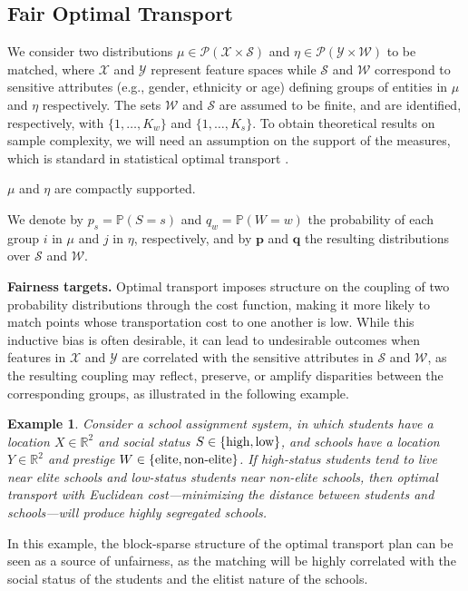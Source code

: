 \documentclass{article}
\newtheorem{ex}[thm]{Example}
\theoremstyle{definition}
\begin{document}
\subsection{Fair Optimal Transport}\label{ssec:fairsinkhorn}
We consider two distributions $\mu \in \mathcal{P}(\mathcal{X}\times \mathcal{S})$ and $\eta \in \mathcal{P}(\mathcal{Y}\times \mathcal{W})$ to be matched, where $\mathcal{X}$ and $\mathcal{Y}$ represent feature spaces while $\mathcal{S}$ and $\mathcal{W}$ correspond to sensitive attributes (e.g., gender, ethnicity or age) defining groups of entities in $\mu$ and $\eta$ respectively. The sets $\mathcal{W}$ and $\mathcal{S}$ are assumed to be finite, and are identified, respectively, with $\{1,\dots,K_w\}$ and $\{1,\dots,K_s\}$. To obtain theoretical results on sample complexity, we will need an assumption on the support of the measures, which is standard in statistical optimal transport \citep{rigollet2022sample}.
\begin{boxasm}
\label{asm:compact_support}
    $\mu$ and $\eta$ are compactly supported.
\end{boxasm}
 We denote by $p_s = \mathbb{P}(S=s)$ and $q_w = \mathbb{P}(W=w)$ the probability of each group $i$ in $\mu$ and $j$ in $\eta$, respectively, and by $\mathbf{p}$ and $\mathbf{q}$ the resulting distributions over   $\mathcal{S}$ and $\mathcal{W}$.

\textbf{Fairness targets.} 
Optimal transport imposes structure on the coupling of two probability distributions through the cost function, making it more likely to match points whose transportation cost to one another is low. While this inductive bias is often desirable, it can lead to undesirable outcomes when features in $\mathcal{X}$ and $\mathcal{Y}$ are correlated with the sensitive attributes in $\mathcal{S}$ and $\mathcal{W}$, as the resulting coupling may reflect, preserve, or amplify disparities between the corresponding groups, as illustrated in the following example. 
\begin{ex}
    \label{ex:1}
    Consider a school assignment system, in which students have a location $X \in \mathbb{R}^2$ and social status $S \in \{\textnormal{high}, \textnormal{low}\}$, and schools have a location $Y \in \mathbb{R}^2$ and prestige $W \in \{\textnormal{elite}, \textnormal{non-elite}\}$. If high-status students tend to live near elite schools and low-status students near non-elite schools, then optimal transport with Euclidean cost—minimizing the distance between students and schools—will produce highly segregated schools.
\end{ex}
In this example, the block-sparse structure of the optimal transport plan can be seen as a source of unfairness, as the matching will be highly correlated with the social status of the students and the elitist nature of the schools.
\end{document}
